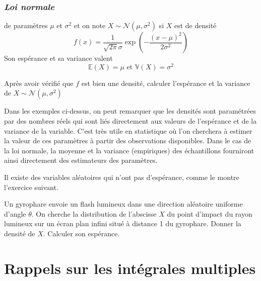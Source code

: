 \subsection*{\emph{Loi normale}}\label{II-loi-normale}

de paramètres \(\mu\) et \(\sigma^2\) et on note
\(X \sim \mathcal{N}(\mu,\sigma^2)\) si \(X\) est de densité
\[f(x) = \frac{1}{\sqrt{2\pi}\sigma}\exp\left(-\frac{(x-\mu)^2}{2\sigma^2}\right)\]
Son espérance et sa variance valent
\[\mathbb{E}(X) =  \mu \text{ et } \mathbb{V}(X) = \sigma^2\]

\label{II-moments-gauss}
Après avoir vérifié que \(f\) est bien une densité, calculer l'espérance
et la variance de
\(X \sim \mathcal{N}(\mu,\sigma^2)\)

\begin{remarque}\label{II-estimation-statistique}

Dans les exemples ci-dessus, on peut remarquer que les densités sont
paramétrées par des nombres réels qui sont liés directement aux valeurs
de l'espérance et de la variance de la variable. C'est très utile en
statistique où l'on cherchera à estimer la valeur de ces paramètres à
partir des observations disponibles. Dans le cas de la loi normale, la
moyenne et la variance (empiriques) des échantillons fourniront ainsi
directement des estimateurs des paramètres.

Il existe des variables aléatoires qui n'ont pas d'espérance, comme le
montre l'exercice suivant.
\end{remarque}

\label{II-exo-cauchy}
Un gyrophare envoie un flash lumineux dans une direction aléatoire
uniforme d'angle \(\theta\). On cherche la distribution de l'abscisse
\(X\) du point d'impact du rayon lumineux sur un écran plan infini situé
à distance 1 du gyrophare. Donner la densité de \(X\). Calculer son
espérance.

\chapter{Rappels sur les intégrales
multiples}\label{II-rappels-sur-les-intuxe9grales-multiples}

